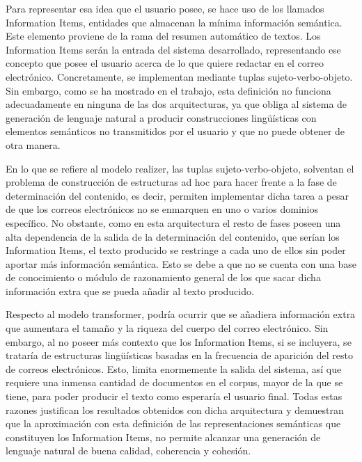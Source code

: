 Para representar esa idea que el usuario posee, se hace uso de los llamados Information Items, entidades que almacenan la mínima información semántica. Este elemento proviene de la rama del resumen automático de textos. Los Information Items serán la entrada del sistema desarrollado, representando ese concepto que posee el usuario acerca de lo que quiere redactar en el correo electrónico. Concretamente, se implementan mediante tuplas sujeto-verbo-objeto. Sin embargo, como se ha mostrado en el trabajo, esta definición no funciona adecuadamente en ninguna de las dos arquitecturas, ya que obliga al sistema de generación de lenguaje natural a producir construcciones lingüísticas con elementos semánticos no transmitidos por el usuario y que no puede obtener de otra manera.

En lo que se refiere al modelo realizer, las tuplas sujeto-verbo-objeto, solventan el problema de construcción de estructuras ad hoc para hacer frente a la fase de determinación del contenido, es decir, permiten implementar dicha tarea a pesar de que los correos electrónicos no se enmarquen en uno o varios dominios específico. No obstante, como en esta arquitectura el resto de fases poseen una alta dependencia de la salida de la determinación del contenido, que serían los Information Items, el texto producido se restringe a cada uno de ellos sin poder aportar más información semántica. Esto se debe a que no se cuenta con una base de conocimiento o módulo de razonamiento general de los que sacar dicha información extra que se pueda añadir al texto producido.

Respecto al modelo transformer, podría ocurrir que se añadiera información extra que aumentara el tamaño y la riqueza del cuerpo del correo electrónico. Sin embargo, al no poseer más contexto que los Information Items, si se incluyera, se trataría de estructuras lingüísticas basadas en la frecuencia de aparición del resto de correos electrónicos. Esto, limita enormemente la salida del sistema, así que requiere una inmensa cantidad de documentos en el corpus, mayor de la que se tiene, para poder producir el texto como esperaría el usuario final. Todas estas razones justifican los resultados obtenidos con dicha arquitectura y demuestran que la aproximación con esta definición de las representaciones semánticas que constituyen los Information Items, no permite alcanzar una generación de lenguaje natural de buena calidad, coherencia y cohesión.

